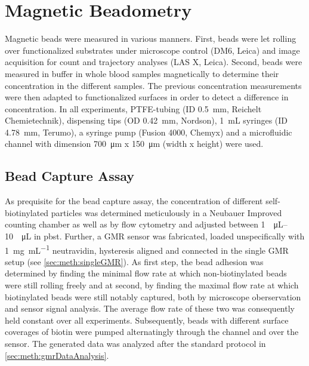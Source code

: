 \section{Magnetic Beadometry}
Magnetic beads were measured in various manners. First, beads were let rolling over functionalized substrates under microscope control (DM6, Leica) and image acquisition for count and trajectory analyses (LAS X, Leica). Second, beads were measured in buffer in whole blood samples magnetically to determine their concentration in the different samples. The previous concentration measurements were then adapted to functionalized surfaces in order to detect a difference in concentration. In all experiments, PTFE-tubing (ID \SI{0.5}{\milli\meter}, Reichelt Chemietechnik), dispensing tips (OD \SI{0.42}{\milli\meter}, Nordson), \SI{1}{\milli\liter} syringes (ID \SI{4.78}{\milli\meter}, Terumo), a syringe pump (Fusion 4000, Chemyx) and a microfluidic channel with dimension \SI{700}{\micro\meter} x \SI{150}{\micro\meter} (width x height) were used.




\subsection{Bead Capture Assay}
As prequisite for the bead capture assay, the concentration of different self-biotinylated particles was determined meticulously in a Neubauer Improved counting chamber as well as by flow cytometry and adjusted between \SIrange{1}{10}{\per\micro\liter} in \gls{pbst}. Further, a GMR sensor was fabricated, loaded unspecifically with \SI{1}{\milli\gram\per\milli\liter} neutravidin, hysteresis aligned and connected in the single GMR setup (see \ref{sec:meth:singleGMR}). As first step, the bead adhesion was determined by finding the minimal flow rate at which non-biotinylated beads were still rolling freely and at second, by finding the maximal flow rate at which biotinylated beads were still notably captured, both by microscope oberservation and sensor signal analysis. The average flow rate of these two was consequently held constant over all experiments. Subsequently, beads with different surface coverages of biotin were pumped alternatingly through the channel and over the sensor. The generated data was analyzed after the standard protocol in \ref{sec:meth:gmrDataAnalysis}.

